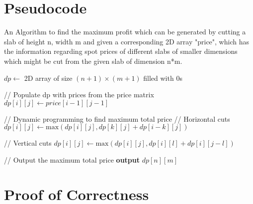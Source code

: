 \documentclass{article}
\begin{document}
{\newpage
\section*{\huge{Pseudocode}}

\fontsize{12}{15}\selectfont{
Below is the pseudocode which represents the logic of the C++ code we had written for the problem, in a more abstract and readable form. The function takes as input the height, width and a 2D array for the spot price of the slab. The function returns the maximum profit achievable by cutting the slab as per the information in the spot price array.
}

\begin{algorithm}
\caption{An Algorithm to find the maximum profit which can be generated by cutting a slab of height n, width m and given a corresponding 2D array "price", which has the information regarding spot prices of different slabs of smaller dimensions which might be cut from the given slab of dimension n*m.}
\begin{algorithmic}[1]
    \State $dp \gets$ 2D array of size $(n+1) \times (m+1)$ filled with 0s
    
    \State // Populate dp with prices from the price matrix
            \State $dp[i][j] \gets price[i - 1][j - 1]$
        \EndFor
    \EndFor
    
    \State // Dynamic programming to find maximum total price
            \State // Horizontal cuts
                \State $dp[i][j] \gets \text{max}(dp[i][j], dp[k][j] + dp[i - k][j])$
            \EndFor
            
            \State // Vertical cuts
                \State $dp[i][j] \gets \text{max}(dp[i][j], dp[i][l] + dp[i][j - l])$
            \EndFor
        \EndFor
    \EndFor
    
    \State // Output the maximum total price
    \State \textbf{output} $dp[n][m]$
\EndProcedure
\end{algorithmic}
\end{algorithm}
    
\newpage


\section*{\huge Proof of Correctness}

}
\end{document}
